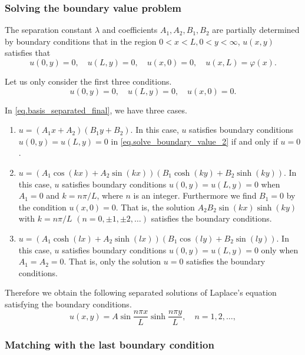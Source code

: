 \subsubsection{Solving the boundary value problem}
The separation constant $\lambda$ and coefficients $A_1, A_2, B_1, B_2$ are partially determined by boundary conditions that in the region $0<x<L, 0<y<\infty$, $u(x, y)$ satisfies that
\begin{equation}\label{eq.solve_boundary_value_1}
u(0, y)=0, \quad u(L, y)=0, \quad u(x, 0)=0, \quad u(x, L)=\varphi(x).
\end{equation}

Let us only consider the first three conditions.
\begin{equation}\label{eq.solve_boundary_value_2}
u(0, y)=0, \quad u(L, y)=0, \quad u(x, 0)=0.
\end{equation}

In \eqref{eq.basis_separated_final}, we have three cases.

\begin{enumerate}
    \item $u=\left(A_1 x+A_2\right)\left(B_1 y+B_2\right)$. In this case, $u$ satisfies boundary conditions $u(0, y)=u(L, y)=0$ in \eqref{eq.solve_boundary_value_2} if and only if $u = 0$.
    \item $u = \left(A_1 \cos (k x)+A_2 \sin (k x)\right)\left(B_1 \cosh (k y)+B_2 \sinh (k y)\right)$. In this case, $u$ satisfies boundary conditions $u(0, y)=u(L, y)=0$ when $A_1=0$ and $k=n \pi / L$, where $n$ is an integer. Furthermore we find $B_1=0$ by the condition $u(x, 0)=0$. That is, the solution $A_2 B_2 \sin (k x) \sinh (k y)$ with $k=n \pi / L$ $(n=0, \pm 1, \pm 2, \ldots)$ satisfies the boundary conditions.
     
    \item $u = \left(A_1 \cosh (l x)+A_2 \sinh (l x)\right)\left(B_1 \cos (l y)+B_2 \sin (l y)\right)$. In this case, $u$ satisfies boundary conditions $u(0, y)=u(L, y)=0$ only when $A_1=A_2=0$. That is, only the solution $u=0$ satisfies the boundary conditions.
\end{enumerate}

Therefore we obtain the following separated solutions of Laplace's equation satisfying the boundary conditions.
\begin{equation}
u(x, y)=A \sin \frac{n \pi x}{L} \sinh \frac{n \pi y}{L}, \quad n=1,2, \ldots,
\end{equation}

\subsubsection{Matching with the last boundary condition}\label{sec.match_boundary}

